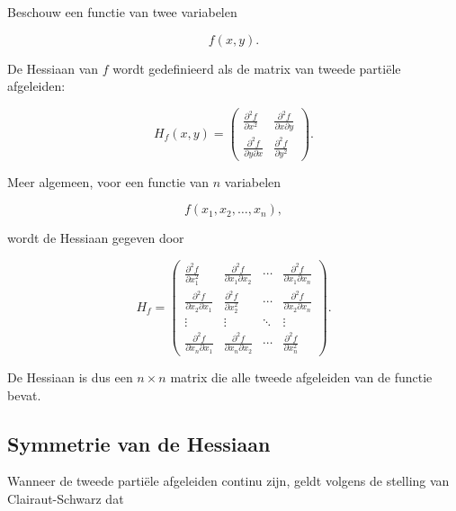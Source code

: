 \documentclass[11pt,a4paper]{article}
\begin{document}
    Beschouw een functie van twee variabelen

    \[
        f(x,y).
    \]

    De Hessiaan van $f$ wordt gedefinieerd als de matrix van tweede partiële
    afgeleiden:

    \[
        H_f(x,y)
        =
        \begin{pmatrix}
            \frac{\partial^2 f}{\partial x^2} &
            \frac{\partial^2 f}{\partial x \partial y} \\
            \frac{\partial^2 f}{\partial y \partial x} &
            \frac{\partial^2 f}{\partial y^2}
        \end{pmatrix}.
    \]

    Meer algemeen, voor een functie van $n$ variabelen

    \[
        f(x_1,x_2,\dots,x_n),
    \]

    wordt de Hessiaan gegeven door

    \[
        H_f =
        \begin{pmatrix}
            \frac{\partial^2 f}{\partial x_1^2} &
            \frac{\partial^2 f}{\partial x_1\partial x_2} &
            \cdots &
            \frac{\partial^2 f}{\partial x_1\partial x_n} \\

            \frac{\partial^2 f}{\partial x_2\partial x_1} &
            \frac{\partial^2 f}{\partial x_2^2} &
            \cdots &
            \frac{\partial^2 f}{\partial x_2\partial x_n} \\

            \vdots & \vdots & \ddots & \vdots \\

            \frac{\partial^2 f}{\partial x_n\partial x_1} &
            \frac{\partial^2 f}{\partial x_n\partial x_2} &
            \cdots &
            \frac{\partial^2 f}{\partial x_n^2}
        \end{pmatrix}.
    \]

    De Hessiaan is dus een $n \times n$ matrix die alle tweede afgeleiden
    van de functie bevat.

    \subsection{Symmetrie van de Hessiaan}

    Wanneer de tweede partiële afgeleiden continu zijn, geldt volgens de
    stelling van Clairaut-Schwarz dat
\end{document}
